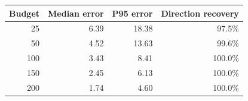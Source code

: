 \begin{tabular}{rrrr}
\toprule
Budget & Median error & P95 error & Direction recovery \\
\midrule
25 & 6.39 & 18.38 & 97.5\% \\
50 & 4.52 & 13.63 & 99.6\% \\
100 & 3.43 & 8.41 & 100.0\% \\
150 & 2.45 & 6.13 & 100.0\% \\
200 & 1.74 & 4.60 & 100.0\% \\
\bottomrule
\end{tabular}
